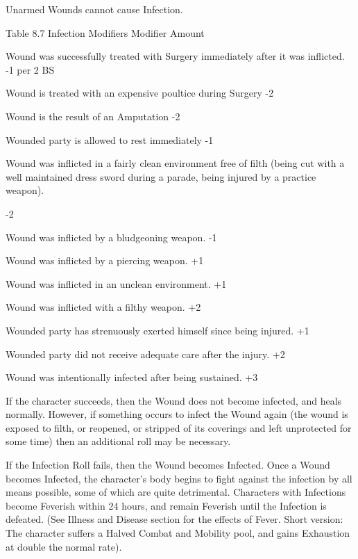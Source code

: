 \documentclass[oneside,11pt,english]{book}
\begin{document}
 

Unarmed Wounds cannot cause Infection. 

 

Table 8.7 Infection Modifiers 
Modifier Amount 

Wound was successfully treated with Surgery immediately after it was inflicted. -1 per 2 
BS 

Wound is treated with an expensive poultice during Surgery -2 

Wound is the result of an Amputation -2 

Wounded party is allowed to rest immediately -1 

Wound was inflicted in a fairly clean environment free of filth (being cut with a well 
maintained dress sword during a parade, being injured by a practice weapon). 

-2 

Wound was inflicted by a bludgeoning weapon. -1 

Wound was inflicted by a piercing weapon. +1 

Wound was inflicted in an unclean environment. +1 

Wound was inflicted with a filthy weapon. +2 

Wounded party has strenuously exerted himself since being injured. +1 

Wounded party did not receive adequate care after the injury. +2 

Wound was intentionally infected after being sustained. +3 

 

 

If the character succeeds, then the Wound does not become infected, and heals normally. However, if 
something occurs to infect the Wound again (the wound is exposed to filth, or reopened, or stripped of its 
coverings and left unprotected for some time) then an additional roll may be necessary. 

 


If the Infection Roll fails, then the Wound becomes Infected. Once a Wound becomes Infected, the 
character’s body begins to fight against the infection by all means possible, some of which are quite 
detrimental. Characters with Infections become Feverish within 24 hours, and remain Feverish until the 
Infection is defeated. (See Illness and Disease section for the effects of Fever. Short version: The 
character suffers a Halved Combat and Mobility pool, and gains Exhaustion at double the normal rate). 
\end{document}
